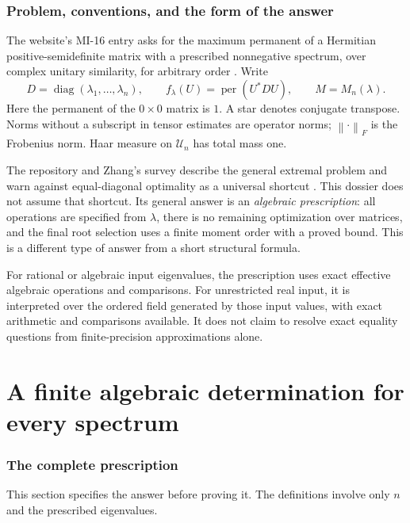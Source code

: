 \documentclass[11pt]{article}
\newcommand{\per}{\operatorname{per}}
\newcommand{\diag}{\operatorname{diag}}
\newcommand{\U}{\mathcal U}
\newcommand{\norm}[1]{\left\lVert#1\right\rVert}
\theoremstyle{definition}\newtheorem{definition}[theorem]{Definition}
\theoremstyle{remark}\newtheorem{remark}[theorem]{Remark}
\begin{document}
\section{Problem, conventions, and the form of the answer}
The website's MI-16 entry asks for the maximum permanent of a Hermitian positive-semidefinite matrix with a prescribed nonnegative spectrum, over complex unitary similarity, for arbitrary order \cite{catalog}. Write
\[
 D=\diag(\lambda_1,\ldots,\lambda_n),\qquad
 f_\lambda(U)=\per(U^*DU),\qquad
 M=M_n(\lambda).
\]
Here the permanent of the $0\times0$ matrix is $1$. A star denotes conjugate transpose. Norms without a subscript in tensor estimates are operator norms; $\norm{\cdot}_F$ is the Frobenius norm. Haar measure on $\U_n$ has total mass one.

The repository and Zhang's survey describe the general extremal problem and warn against equal-diagonal optimality as a universal shortcut \cite{catalog,zhang}. This dossier does not assume that shortcut. Its general answer is an \emph{algebraic prescription}: all operations are specified from $\lambda$, there is no remaining optimization over matrices, and the final root selection uses a finite moment order with a proved bound. This is a different type of answer from a short structural formula.

For rational or algebraic input eigenvalues, the prescription uses exact effective algebraic operations and comparisons. For unrestricted real input, it is interpreted over the ordered field generated by those input values, with exact arithmetic and comparisons available. It does not claim to resolve exact equality questions from finite-precision approximations alone.

\part{A finite algebraic determination for every spectrum}

\section{The complete prescription}\label{sec:prescription}
This section specifies the answer before proving it. The definitions involve only $n$ and the prescribed eigenvalues.
\end{document}
